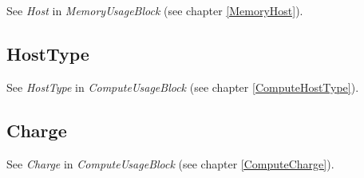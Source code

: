 See \emph{Host} in \emph{MemoryUsageBlock} (see chapter \ref{MemoryHost}).





\subsection{HostType}

See \emph{HostType} in \emph{ComputeUsageBlock} (see chapter \ref{ComputeHostType}).






\subsection{Charge}

See \emph{Charge} in \emph{ComputeUsageBlock} (see chapter \ref{ComputeCharge}).
